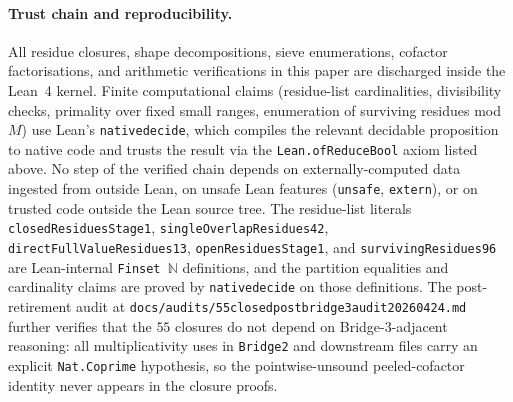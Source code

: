 \documentclass[11pt]{article}
\renewcommand{\_}{\origunderscore\allowbreak}
\theoremstyle{definition}
\theoremstyle{remark}
\begin{document}
\paragraph{Trust chain and reproducibility.}
All residue closures, shape decompositions, sieve enumerations,
cofactor factorisations, and arithmetic verifications in this paper
are discharged inside the Lean~4 kernel. Finite computational claims
(residue-list cardinalities, divisibility checks, primality over
fixed small ranges, enumeration of surviving residues mod~$M$) use
Lean's \texttt{native\_decide}, which compiles the relevant
decidable proposition to native code and trusts the result via the
\texttt{Lean.ofReduceBool} axiom listed above. No step of the
verified chain depends on externally-computed data ingested from
outside Lean, on unsafe Lean features (\texttt{unsafe}, \texttt{extern}),
or on trusted code outside the Lean source tree.
The residue-list literals \texttt{closedResiduesStage1},
\texttt{singleOverlapResidues42}, \texttt{directFullValueResidues13},
\texttt{openResiduesStage1}, and \texttt{survivingResidues96} are
Lean-internal \texttt{Finset~\ensuremath{\mathbb{N}}} definitions,
and the partition equalities and cardinality claims are proved by
\texttt{native\_decide} on those definitions.
The post-retirement audit at
\texttt{docs/audits/55\_closed\_post\_bridge3\_audit\_20260424.md}
further verifies that the $55$ closures do not depend on
Bridge-3-adjacent reasoning: all multiplicativity uses in
\texttt{Bridge2} and downstream files carry an explicit
\texttt{Nat.Coprime} hypothesis, so the pointwise-unsound
peeled-cofactor identity never appears in the closure proofs.
\end{document}
